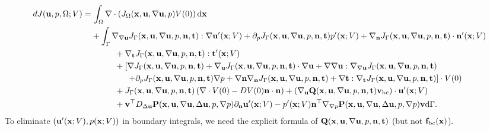 \documentclass[oneside,11pt]{book}
\numberwithin{equation}{section}
\begin{document}
\begin{enumerate}[leftmargin=0in]
    \begin{align*}
        dJ({\bf u},p,\Omega;V) =&\, \int_\Omega \nabla\cdot\left(J_\Omega({\bf x},{\bf u},\nabla{\bf u},p)V(0)\right){\rm d}{\bf x}\\
        &+ \int_\Gamma \nabla_{\nabla{\bf u}}J_\Gamma({\bf x},{\bf u},\nabla{\bf u},p,{\bf n},{\bf t}):\nabla{\bf u}'({\bf x};V) + \partial_pJ_\Gamma({\bf x},{\bf u},\nabla{\bf u},p,{\bf n},{\bf t})p'({\bf x};V) + \nabla_{\bf n}J_\Gamma({\bf x},{\bf u},\nabla{\bf u},p,{\bf n},{\bf t})\cdot{\bf n}'({\bf x};V)\\
        &\hspace{1cm}+ \nabla_{\bf t}J_\Gamma({\bf x},{\bf u},\nabla{\bf u},p,{\bf n},{\bf t}):{\bf t}'({\bf x};V)\\
        &\hspace{1cm}+ \left[\nabla J_\Gamma({\bf x},{\bf u},\nabla{\bf u},p,{\bf n},{\bf t}) + \nabla_{\bf u}J_\Gamma({\bf x},{\bf u},\nabla{\bf u},p,{\bf n},{\bf t})\cdot\nabla{\bf u} + \nabla\nabla{\bf u}:\nabla_{\nabla{\bf u}}J_\Gamma({\bf x},{\bf u},\nabla{\bf u},p,{\bf n},{\bf t})\right.\\
        &\hspace{15mm} \left.+ \partial_pJ_\Gamma({\bf x},{\bf u},\nabla{\bf u},p,{\bf n},{\bf t})\nabla p + \nabla{\bf n}\nabla_{\bf n}J_\Gamma({\bf x},{\bf u},\nabla{\bf u},p,{\bf n},{\bf t}) + \nabla{\bf t}:\nabla_{\bf t}J_\Gamma({\bf x},{\bf u},\nabla{\bf u},p,{\bf n},{\bf t})\right]\cdot V(0)\\
        &\hspace{1cm}+ J_\Gamma({\bf x},{\bf u},\nabla{\bf u},p,{\bf n},{\bf t})\left(\nabla\cdot V(0) - DV(0){\bf n}\cdot{\bf n}\right) + \left(\nabla_{\bf u}{\bf Q}({\bf x},{\bf u},\nabla{\bf u},p,{\bf n},{\bf t}){\bf v}_{\rm bc}\right)\cdot{\bf u}'({\bf x};V)\\
        &\hspace{1cm}+ {\bf v}^\top D_{\Delta{\bf u}}{\bf P}({\bf x},{\bf u},\nabla{\bf u},\Delta{\bf u},p,\nabla p)\partial_{\bf n}{\bf u}'({\bf x};V) - p'({\bf x};V){\bf n}^\top\nabla_{\nabla p}{\bf P}({\bf x},{\bf u},\nabla{\bf u},\Delta{\bf u},p,\nabla p){\bf v}{\rm d}\Gamma.
    \end{align*}
    To eliminate $({\bf u}'({\bf x};V),p({\bf x};V))$ in boundary integrals, we need the explicit formula of ${\bf Q}({\bf x},{\bf u},\nabla{\bf u},p,{\bf n},{\bf t})$ (but not ${\bf f}_{\rm bc}({\bf x})$).
    

\end{enumerate}
\end{document}
